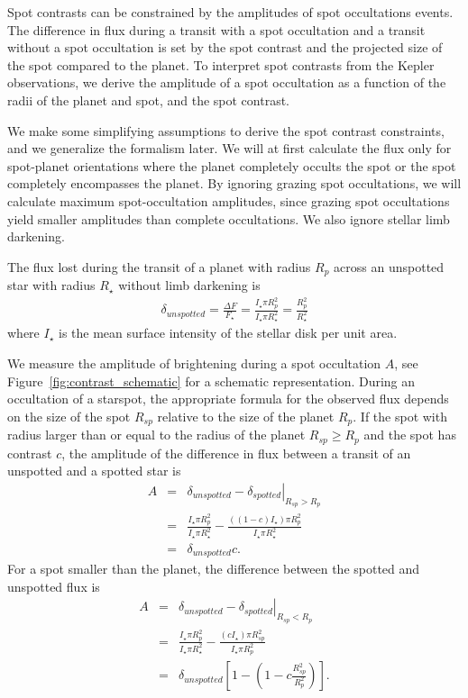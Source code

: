 \documentclass[iop]{emulateapj}
\begin{document}
Spot contrasts can be constrained by the amplitudes of spot occultations events. The difference in flux during a transit with a spot occultation and a transit without a spot occultation is set by the spot contrast and the projected size of the spot compared to the planet. To interpret spot contrasts from the Kepler observations, we derive the amplitude of a spot occultation as a function of the radii of the planet and spot, and the spot contrast. 

We make some simplifying assumptions to derive the spot contrast constraints, and we generalize the formalism later. We will at first calculate the flux only for spot-planet orientations where the planet completely occults the spot or the spot completely encompasses the planet. By ignoring grazing spot occultations, we will calculate maximum spot-occultation amplitudes, since grazing spot occultations yield smaller amplitudes than complete occultations. We also ignore stellar limb darkening.

The flux lost during the transit of a planet with radius $R_p$ across an unspotted star with radius $R_\star$ without limb darkening is
\begin{eqnarray}
\delta_{unspotted} = \frac{\Delta F}{F_\star} = \frac{I_\star \pi R_p^2}{I_\star \pi R_\star^2} = \frac{R_p^2}{R_\star^2}
\end{eqnarray}
where $I_\star$ is the mean surface intensity of the stellar disk per unit area. 

We measure the amplitude of brightening during a spot occultation $A$, see Figure~\ref{fig:contrast_schematic} for a schematic representation. During an occultation of a starspot, the appropriate formula for the observed flux depends on the size of the spot $R_{sp}$ relative to the size of the planet $R_{p}$. If the spot with radius larger than or equal to the radius of the planet $R_{sp} \ge R_p$ and the spot has contrast $c$, the amplitude of the difference in flux between a transit of an unspotted and a spotted star is
\begin{eqnarray}
 A &=& \left. \delta_{unspotted} - \delta_{spotted} \right|_{R_{sp} > R_p} \\
 &=& \frac{I_\star \pi R_p^2}{I_\star \pi R_\star^2} - \frac{((1 - c)I_\star) \pi R_p^2}{ I_\star \pi R_\star^2}\\
 &=& \delta_{unspotted} c. \label{eqn:bigspot}
\end{eqnarray}
For a spot smaller than the planet, the difference between the spotted and unspotted flux is
\begin{eqnarray}
 A &=& \left. \delta_{unspotted} - \delta_{spotted} \right|_{R_{sp} < R_p} \\
 &=& \frac{I_\star \pi R_p^2}{I_\star \pi R_\star^2} - \frac{(c I_\star) \pi R_{sp}^2}{ I_\star \pi R_p^2}\\
 &=& \delta_{unspotted} \left[1-\left(1-c\frac{R_{sp}^2}{R_p^2}\right)\right]. \label{eqn:littlespot}
\end{eqnarray}
\end{document}
